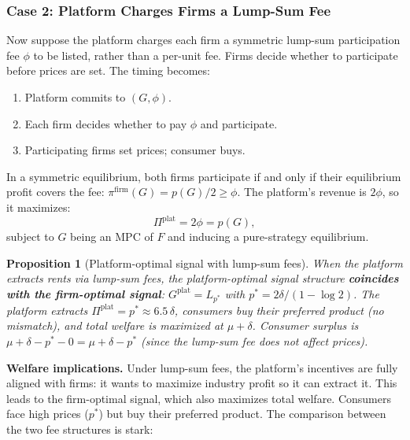 \documentclass[12pt, a4paper]{article}
\newtheorem{proposition}{Proposition}
\begin{document}
\subsubsection{Case 2: Platform Charges Firms a Lump-Sum Fee}

Now suppose the platform charges each firm a symmetric lump-sum participation fee $\phi$ to be listed, rather than a per-unit fee. Firms decide whether to participate before prices are set. The timing becomes:

\begin{enumerate}[nosep]
    \item Platform commits to $(G, \phi)$.
    \item Each firm decides whether to pay $\phi$ and participate.
    \item Participating firms set prices; consumer buys.
\end{enumerate}

In a symmetric equilibrium, both firms participate if and only if their equilibrium profit covers the fee: $\pi^{\text{firm}}(G) = p(G)/2 \geq \phi$. The platform's revenue is $2\phi$, so it maximizes:
\begin{equation}
    \Pi^{\text{plat}} = 2\phi = p(G),
\end{equation}
subject to $G$ being an MPC of $F$ and inducing a pure-strategy equilibrium.

\begin{proposition}[Platform-optimal signal with lump-sum fees]
When the platform extracts rents via lump-sum fees, the platform-optimal signal structure \textbf{coincides with the firm-optimal signal}: $G^{\text{plat}} = L_{p^*}$ with $p^* = 2\delta/(1 - \log 2)$. The platform extracts $\Pi^{\text{plat}} = p^* \approx 6.5\,\delta$, consumers buy their preferred product (no mismatch), and total welfare is maximized at $\mu + \delta$. Consumer surplus is $\mu + \delta - p^* - 0 = \mu + \delta - p^*$ (since the lump-sum fee does not affect prices).
\end{proposition}

\textbf{Welfare implications.} Under lump-sum fees, the platform's incentives are fully aligned with firms: it wants to maximize industry profit so it can extract it. This leads to the firm-optimal signal, which also maximizes total welfare. Consumers face high prices ($p^*$) but buy their preferred product. The comparison between the two fee structures is stark:
\end{document}
